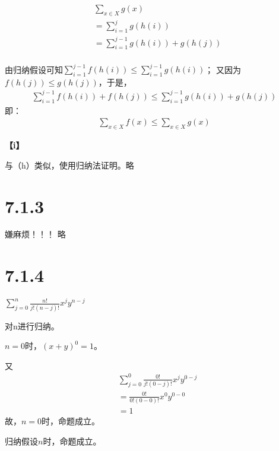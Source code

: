 \documentclass{article}
\theoremstyle{mystyle}
\begin{document}
\begin{align*}
        & \sum \limits_{x \in X} g(x)                    \\
        & = \sum \limits_{i = 1}^j g(h(i))               \\
        & = \sum \limits_{i = 1}^{j-1} g(h(i)) + g(h(j)) \\
\end{align*}

由归纳假设可知$\sum \limits_{i = 1}^{j-1} f(h(i)) \leq \sum \limits_{i = 1}^{j-1} g(h(i))$；
又因为$f(h(j)) \leq g(h(j))$，于是，
\begin{align*}
       \sum \limits_{i = 1}^{j-1} f(h(i)) + f(h(j)) \leq \sum \limits_{i = 1}^{j-1} g(h(i)) + g(h(j))
\end{align*}
即：
\begin{align*}
       \sum \limits_{x \in X} f(x) \leq \sum \limits_{x \in X} g(x)
\end{align*}

\textbf{【i】}

与（h）类似，使用归纳法证明。略

\section*{7.1.3}

嫌麻烦！！！ 略

\section*{7.1.4}
$\sum \limits_{j=0}^n \frac{n!}{j!(n-j)!} x^j y^{n-j}$

对n进行归纳。

$n=0$时，$(x+y)^0=1$。

\noindent 又
\begin{align*}
        & \sum \limits_{j=0}^0 \frac{0!}{j!(0-j)!} x^j y^{0-j} \\
        & = \frac{0!}{0!(0-0)!} x^0 y^{0-0}                    \\
        & = 1
\end{align*}
故，$n=0$时，命题成立。

归纳假设$n$时，命题成立。
\end{document}
